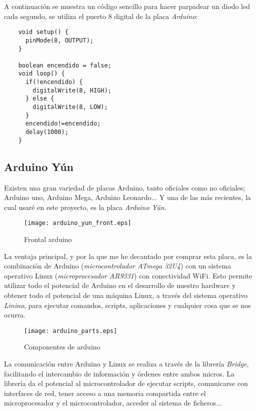 A continuación se muestra un código sencillo para hacer parpadear un diodo led cada segundo, se utiliza el puerto 8 digital de la placa \emph{Arduino}:

\begin{lstlisting}
    void setup() {
      pinMode(8, OUTPUT);
    }

    boolean encendido = false;
    void loop() {
      if(!encendido) {
        digitalWrite(8, HIGH);
      } else {
        digitalWrite(8, LOW);
      }
      encendido!=encendido;
      delay(1000);
    }
\end{lstlisting}

\subsection{Arduino Yún}

Existen una gran variedad de placas Arduino, tanto oficiales como no oficiales; Arduino uno, Arduino Mega, Arduino Leonardo... Y una de las más recientes, la cual usaré en este proyecto, es la placa \emph{Arduino Yún}.

\begin{figure}[h!]
    \centering
    \texttt{[image: arduino\_yun\_front.eps]}
    \caption{Frontal arduino}\label{fig:arduino-yun-front}
\end{figure}

La ventaja principal, y por la que me he decantado por comprar esta placa, es la combinación de Arduino (\emph{microcontrolador ATmega 32U4}) con un sistema operativo Linux (\emph{microprocesador AR9331}) con conectividad WiFi. Esto permite utilizar todo el potencial de Arduino en el desarrollo de nuestro hardware y obtener todo el potencial de una máquina Linux, a través del sistema operativo \emph{Linino}, para ejecutar comandos, scripts, aplicaciones y cualquier cosa que se nos ocurra.

\begin{figure}[h!]
    \centering
    \texttt{[image: arduino\_parts.eps]}
    \caption{Componentes de arduino}\label{fig:arduino-parts}
\end{figure}

La comunicación entre Arduino y Linux se realiza a través de la librería \emph{Bridge}, facilitando el intercambio de información y órdenes entre ambos micros. La librería da el potencial al microcontrolador de ejecutar scripts, comunicarse con interfaces de red, tener acceso a una memoria compartida entre el microprocesador y el microcontrolador, acceder al sistema de ficheros...

